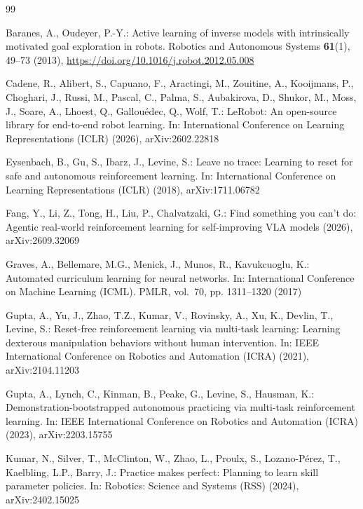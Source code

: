 \documentclass[runningheads]{llncs}
\begin{document}
\begin{thebibliography}{99}

Baranes, A., Oudeyer, P.-Y.: Active learning of inverse models with intrinsically motivated goal exploration in robots. Robotics and Autonomous Systems \textbf{61}(1), 49--73 (2013), \url{https://doi.org/10.1016/j.robot.2012.05.008}

Cadene, R., Alibert, S., Capuano, F., Aractingi, M., Zouitine, A., Kooijmans, P., Choghari, J., Russi, M., Pascal, C., Palma, S., Aubakirova, D., Shukor, M., Moss, J., Soare, A., Lhoest, Q., Gallou\'edec, Q., Wolf, T.: LeRobot: An open-source library for end-to-end robot learning. In: International Conference on Learning Representations (ICLR) (2026), arXiv:2602.22818

Eysenbach, B., Gu, S., Ibarz, J., Levine, S.: Leave no trace: Learning to reset for safe and autonomous reinforcement learning. In: International Conference on Learning Representations (ICLR) (2018), arXiv:1711.06782

Fang, Y., Li, Z., Tong, H., Liu, P., Chalvatzaki, G.: Find something you can't do: Agentic real-world reinforcement learning for self-improving VLA models (2026), arXiv:2609.32069

Graves, A., Bellemare, M.G., Menick, J., Munos, R., Kavukcuoglu, K.: Automated curriculum learning for neural networks. In: International Conference on Machine Learning (ICML). PMLR, vol.~70, pp. 1311--1320 (2017)

Gupta, A., Yu, J., Zhao, T.Z., Kumar, V., Rovinsky, A., Xu, K., Devlin, T., Levine, S.: Reset-free reinforcement learning via multi-task learning: Learning dexterous manipulation behaviors without human intervention. In: IEEE International Conference on Robotics and Automation (ICRA) (2021), arXiv:2104.11203

Gupta, A., Lynch, C., Kinman, B., Peake, G., Levine, S., Hausman, K.: Demonstration-bootstrapped autonomous practicing via multi-task reinforcement learning. In: IEEE International Conference on Robotics and Automation (ICRA) (2023), arXiv:2203.15755

Kumar, N., Silver, T., McClinton, W., Zhao, L., Proulx, S., Lozano-P\'erez, T., Kaelbling, L.P., Barry, J.: Practice makes perfect: Planning to learn skill parameter policies. In: Robotics: Science and Systems (RSS) (2024), arXiv:2402.15025


\end{thebibliography}
\end{document}
